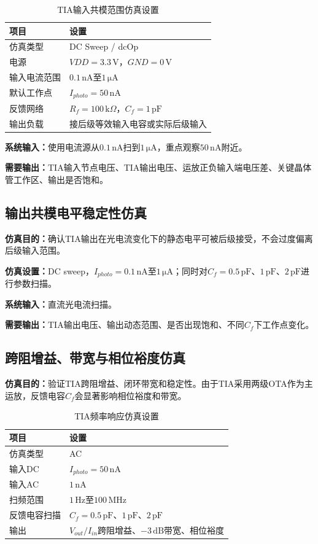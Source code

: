 \documentclass[12pt,a4paper]{ctexart}
\begin{document}
\begin{table}[H]
\centering
\caption{TIA输入共模范围仿真设置}
\begin{tabular}{ll}
\toprule
项目 & 设置 \\
\midrule
仿真类型 & DC Sweep / dcOp \\
电源 & $VDD=3.3\,\mathrm{V}$，$GND=0\,\mathrm{V}$ \\
输入电流范围 & $0.1\,\mathrm{nA}$至$1\,\mathrm{\mu A}$ \\
默认工作点 & $I_{photo}=50\,\mathrm{nA}$ \\
反馈网络 & $R_f=100\,\mathrm{k}\Omega$，$C_f=1\,\mathrm{pF}$ \\
输出负载 & 接后级等效输入电容或实际后级输入 \\
\bottomrule
\end{tabular}
\end{table}

\textbf{系统输入：}使用电流源从$0.1\,\mathrm{nA}$扫到$1\,\mathrm{\mu A}$，重点观察$50\,\mathrm{nA}$附近。

\textbf{需要输出：}TIA输入节点电压、TIA输出电压、运放正负输入端电压差、关键晶体管工作区、输出是否饱和。

\subsection{输出共模电平稳定性仿真}

\textbf{仿真目的：}确认TIA输出在光电流变化下的静态电平可被后级接受，不会过度偏离后级输入范围。

\textbf{仿真设置：}DC sweep，$I_{photo}=0.1\,\mathrm{nA}$至$1\,\mathrm{\mu A}$；同时对$C_f=0.5\,\mathrm{pF}$、$1\,\mathrm{pF}$、$2\,\mathrm{pF}$进行参数扫描。

\textbf{系统输入：}直流光电流扫描。

\textbf{需要输出：}TIA输出电压、输出动态范围、是否出现饱和、不同$C_f$下工作点变化。

\subsection{跨阻增益、带宽与相位裕度仿真}

\textbf{仿真目的：}验证TIA跨阻增益、闭环带宽和稳定性。由于TIA采用两级OTA作为主运放，反馈电容$C_f$会显著影响相位裕度和带宽。

\begin{table}[H]
\centering
\caption{TIA频率响应仿真设置}
\begin{tabular}{ll}
\toprule
项目 & 设置 \\
\midrule
仿真类型 & AC \\
输入DC & $I_{photo}=50\,\mathrm{nA}$ \\
输入AC & $1\,\mathrm{nA}$ \\
扫频范围 & $1\,\mathrm{Hz}$至$100\,\mathrm{MHz}$ \\
反馈电容扫描 & $C_f=0.5\,\mathrm{pF}$、$1\,\mathrm{pF}$、$2\,\mathrm{pF}$ \\
输出 & $V_{out}/I_{in}$跨阻增益、$-3\,\mathrm{dB}$带宽、相位裕度 \\
\bottomrule
\end{tabular}
\end{table}
\end{document}
